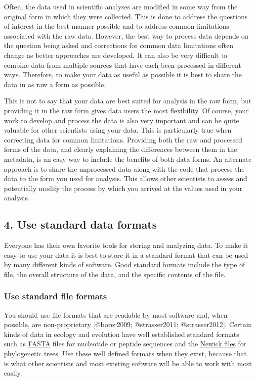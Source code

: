 Often, the data used in scientific analyses are modified in some way
from the original form in which they were collected. This is done to
address the questions of interest in the best manner possible and to
address common limitations associated with the raw data. However, the
best way to process data depends on the question being asked and
corrections for common data limitations often change as better
approaches are developed. It can also be very difficult to combine data
from multiple sources that have each been processed in different ways.
Therefore, to make your data as useful as possible it is best to share
the data in as raw a form as possible.

This is not to say that your data are best suited for analysis in the
raw form, but providing it in the raw form gives data users the most
flexibility. Of course, your work to develop and process the data is
also very important and can be quite valuable for other scientists using
your data. This is particularly true when correcting data for common
limitations. Providing both the raw and processed forms of the data, and
clearly explaining the differences between them in the metadata, is an
easy way to include the benefits of both data forms. An alternate
approach is to share the unprocessed data along with the code that
process the data to the form you used for analysis. This allows other
scientists to assess and potentially modify the process by which you
arrived at the values used in your analysis.

\subsection{4. Use standard data
formats}\label{use-standard-data-formats}

Everyone has their own favorite tools for storing and analyzing data. To
make it easy to use your data it is best to store it in a standard
format that can be used by many different kinds of software. Good
standard formats include the type of file, the overall structure of the
data, and the specific contents of the file.

\subsubsection{Use standard file
formats}\label{use-standard-file-formats}

You should use file formats that are readable by most software and, when
possible, are non-proprietary {[}@borer2009; @strasser2011;
@strasser2012{]}. Certain kinds of data in ecology and evolution have
well established standard formats such as
\href{http://zhanglab.ccmb.med.umich.edu/FASTA/}{FASTA} files for
nucleotide or peptide sequences and the
\href{http://evolution.genetics.washington.edu/phylip/newicktree.html}{Newick
files} for phylogenetic trees. Use these well defined formats when they
exist, because that is what other scientists and most existing software
will be able to work with most easily.

